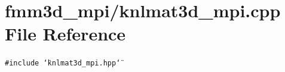\section{fmm3d\_\-mpi/knlmat3d\_\-mpi.cpp File Reference}
\label{knlmat3d__mpi_8cpp}


{\tt \#include \char`\"{}knlmat3d\_\-mpi.hpp\char`\"{}}\par
